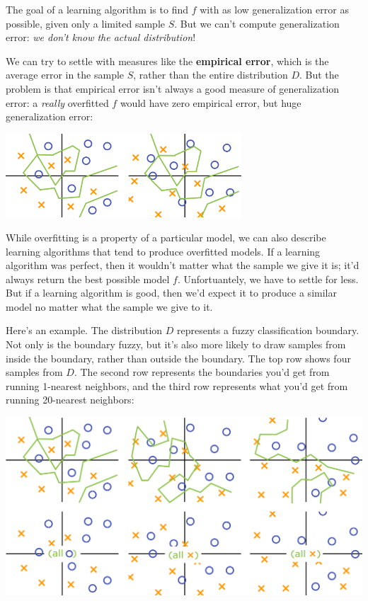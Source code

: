 \documentclass[11pt,paper=letter]{scrartcl}
\begin{document}
The goal of a learning algorithm is to find $f$ with as low generalization error as possible, given only a limited sample $S$. But we can't compute generalization error: \textit{we don't know the actual distribution}!

We can try to settle with measures like the \textbf{empirical error}, which is the average error in the sample $S$, rather than the entire distribution $D$. But the problem is that empirical error isn't always a good measure of generalization error: a \textit{really} overfitted $f$ would have zero empirical error, but huge generalization error:

\begin{center}
  \includegraphics[width=0.66\textwidth]{20.png}
\end{center}

While overfitting is a property of a particular model, we can also describe learning algorithms that tend to produce overfitted models. If a learning algorithm was perfect, then it wouldn't matter what the sample we give it is; it'd always return the best possible model $f$. Unfortuantely, we have to settle for less. But if a learning algorithm is good, then we'd expect it to produce a similar model no matter what the sample we give to it.

Here's an example. The distribution $D$ represents a fuzzy classification boundary. Not only is the boundary fuzzy, but it's also more likely to draw samples from inside the boundary, rather than outside the boundary. The top row shows four samples from $D$. The second row represents the boundaries you'd get from running 1-nearest neighbors, and the third row represents what you'd get from running 20-nearest neighbors:

\begin{center}
  \includegraphics[width=\textwidth]{21.png}
\end{center}
\end{document}
